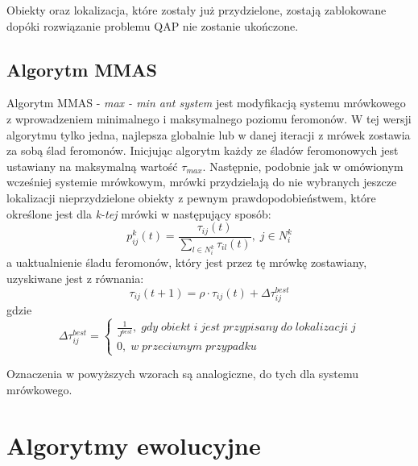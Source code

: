 Obiekty oraz lokalizacja, które zostały już przydzielone, zostają zablokowane dopóki rozwiązanie problemu QAP nie zostanie ukończone.

\subsection{Algorytm MMAS}
Algorytm MMAS - \textit{max - min ant system} jest modyfikacją systemu mrówkowego z wprowadzeniem minimalnego i maksymalnego poziomu feromonów. W tej wersji algorytmu tylko jedna, najlepsza globalnie lub w danej iteracji z mrówek zostawia za sobą ślad feromonów. Inicjując algorytm każdy ze śladów feromonowych jest ustawiany na maksymalną wartość $\tau_{max}$. Następnie, podobnie jak w omówionym wcześniej systemie mrówkowym, mrówki przydzielają do nie wybranych jeszcze lokalizacji nieprzydzielone obiekty z pewnym prawdopodobieństwem, które określone jest dla \textit{k-tej} mrówki w następujący sposób:
\newline
\begin{equation}
p_{ij}^k(t)=\frac{\tau_{ij}(t)}{\sum\limits_{l\in N_i^k} \tau_{il}(t)}, \; j \in N_i^k
\end{equation}
\newline
a uaktualnienie śladu feromonów, który jest przez tę mrówkę zostawiany, uzyskiwane jest z równania:
\newline
\begin{equation}
\tau_{ij}(t+1)=\rho \cdot \tau_{ij}(t)+\Delta \tau_{ij}^{best}
\end{equation}
\newline
gdzie
\newline
\begin{equation}
\Delta \tau_{ij}^{best} = \left\{ \begin{array}{ccc} \frac{1}{J^{best}}, \; gdy \; obiekt \; i \; jest \; przypisany \; do \; lokalizacji \; j \\ 0, \; w \; przeciwnym \;  przypadku \end{array} \right.
\end{equation}
\newline

Oznaczenia w powyższych wzorach są analogiczne, do tych dla systemu mrówkowego.
\section{Algorytmy ewolucyjne}
\label{sec:AE}

